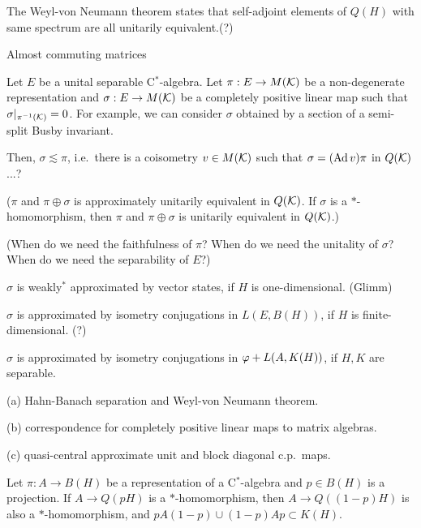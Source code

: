 \documentclass{../../large}
\begin{document}
The Weyl-von Neumann theorem states that self-adjoint elements of $Q(H)$ with same spectrum are all unitarily equivalent.(?)

\begin{prb}
Almost commuting matrices
\end{prb}

\begin{prb}
Let $E$ be a unital separable C$^*$-algebra.
Let $\pi:E\to M(\mathcal{K})$ be a non-degenerate representation and $\sigma:E\to M(\mathcal{K})$ be a completely positive linear map such that $\sigma|_{\pi^{-1}(\mathcal{K})}=0$.
For example, we can consider $\sigma$ obtained by a section of a semi-split Busby invariant.

Then, $\sigma\lesssim\pi$, i.e.~there is a coisometry $v\in M(\mathcal{K})$ such that $\sigma=(\operatorname{Ad} v)\pi$ in $Q(\mathcal{K})$...?

($\pi$ and $\pi\oplus\sigma$ is approximately unitarily equivalent in $Q(\mathcal{K})$. If $\sigma$ is a $*$-homomorphism, then $\pi$ and $\pi\oplus\sigma$ is unitarily equivalent in $Q(\mathcal{K})$.)

(When do we need the faithfulness of $\pi$?
When do we need the unitality of $\sigma$?
When do we need the separability of $E$?)
\begin{parts}
\item $\sigma$ is weakly$^*$ approximated by vector states, if $H$ is one-dimensional. (Glimm)
\item $\sigma$ is approximated by isometry conjugations in $L(E,B(H))$, if $H$ is finite-dimensional. (?)
\item $\sigma$ is approximated by isometry conjugations in $\varphi+L(A,K(H))$, if $H,K$ are separable.
\end{parts}
\end{prb}
\begin{pf}
(a)
Hahn-Banach separation and Weyl-von Neumann theorem.

(b)
correspondence for completely positive linear maps to matrix algebras.

(c)
quasi-central approximate unit and block diagonal c.p.~maps.





Let $\pi:A\to B(H)$ be a representation of a C$^*$-algebra and $p\in B(H)$ is a projection.
If $A\to Q(pH)$ is a $*$-homomorphism, then $A\to Q((1-p)H)$ is also a $*$-homomorphism, and $pA(1-p)\cup(1-p)Ap\subset K(H)$.
\end{pf}
\end{document}
